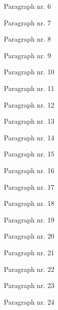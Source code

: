 \documentclass[b5paper]{book}
\begin{document}
\resumenumbering
\numberpstarttrue


\pstart%
    Paragraph nr. 6%
\pend

\pstart%
    Paragraph nr. 7%
\pend

\pstart%
    Paragraph nr. 8%
\pend

\pstart%
    Paragraph nr. 9%
\pend

\pstart%
    Paragraph nr. 10%
\pend

\pstart%
    Paragraph nr. 11%
\pend

\pstart%
    Paragraph nr. 12%
\pend

\pstart%
    Paragraph nr. 13%
\pend

\pstart%
    Paragraph nr. 14%
\pend

\pstart%
    Paragraph nr. 15%
\pend

\pstart%
    Paragraph nr. 16%
\pend

\pstart%
    Paragraph nr. 17%
\pend

\pstart%
    Paragraph nr. 18%
\pend

\pstart%
    Paragraph nr. 19%
\pend

\pstart%
    Paragraph nr. 20%
\pend

\pstart%
    Paragraph nr. 21%
\pend

\pstart%
    Paragraph nr. 22%
\pend

\pstart%
    Paragraph nr. 23%
\pend

\pstart%
    Paragraph nr. 24%
\pend

\endnumbering
\end{document}
